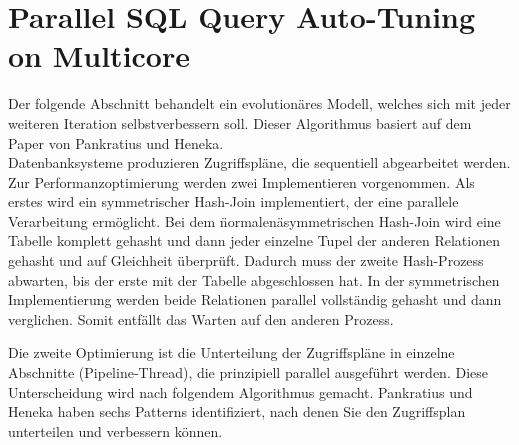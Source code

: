 \section{Parallel SQL Query Auto-Tuning on Multicore}
\label{sec:Parallel-SQL-Query-Auto-Tuning}
Der folgende Abschnitt behandelt ein evolutionäres Modell, welches sich mit jeder weiteren Iteration selbstverbessern soll. Dieser Algorithmus basiert auf dem Paper von Pankratius und Heneka.\\

Datenbanksysteme produzieren Zugriffspläne, die sequentiell abgearbeitet werden. Zur Performanzoptimierung werden zwei Implementieren vorgenommen. Als erstes wird ein symmetrischer Hash-Join implementiert, der eine parallele Verarbeitung ermöglicht. Bei dem \"normalen\" asymmetrischen Hash-Join wird eine Tabelle komplett gehasht und dann jeder einzelne Tupel der anderen Relationen gehasht und auf Gleichheit überprüft. Dadurch muss der zweite Hash-Prozess abwarten, bis der erste mit der Tabelle abgeschlossen hat. In der symmetrischen Implementierung werden beide Relationen parallel vollständig gehasht und dann verglichen. Somit entfällt das Warten auf den anderen Prozess.

Die zweite Optimierung ist die Unterteilung der Zugriffspläne in einzelne Abschnitte (Pipeline-Thread), die prinzipiell parallel ausgeführt werden. Diese Unterscheidung wird nach folgendem Algorithmus gemacht. Pankratius und Heneka haben sechs Patterns identifiziert, nach denen Sie den Zugriffsplan unterteilen und verbessern können.

